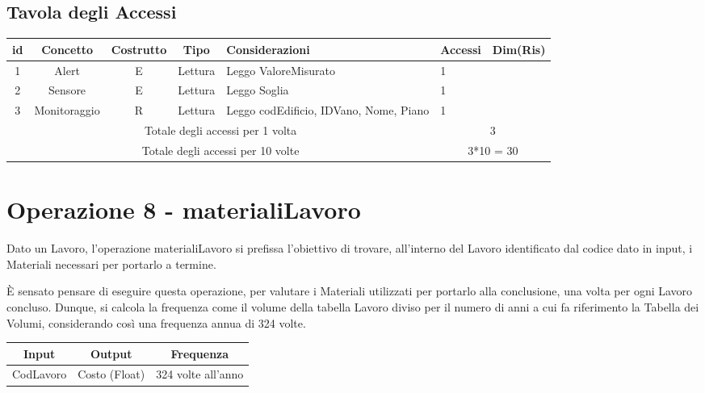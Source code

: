 \documentclass[12pt,a4paper]{report}
\begin{document}
        \subsection{Tavola degli Accessi}
        \begin{tabular}{|c|c|c|c|p{4cm}|p{3cm}|p{3cm}|}
            \hline
            \textbf{id} & \textbf{Concetto} & \textbf{Costrutto} & \textbf{Tipo} & \textbf{Considerazioni} & \textbf{Accessi} & \textbf{Dim(Ris)} \\ \hline
            1 & Alert & E & Lettura & Leggo ValoreMisurato & 1 & ~ \\ \hline
            2 & Sensore & E & Lettura & Leggo Soglia & 1 & ~ \\ \hline
            3 & Monitoraggio & R & Lettura & Leggo codEdificio, IDVano, Nome, Piano & 1 & ~ \\ \hline
            \multicolumn{5}{|c|}{Totale degli accessi per 1 volta} & \multicolumn{2}{|c|}{3} \\ \hline
            \multicolumn{5}{|c|}{Totale degli accessi per 10 volte} & \multicolumn{2}{|c|}{3*10 = 30} \\ \hline
        \end{tabular}

        \section{Operazione 8 - materialiLavoro}
        Dato un Lavoro, l'operazione materialiLavoro si prefissa l'obiettivo di trovare, all'interno del Lavoro identificato dal codice dato in input, i Materiali necessari per portarlo a termine.

        È sensato pensare di eseguire questa operazione, per valutare i Materiali utilizzati per portarlo alla conclusione, una volta per ogni Lavoro concluso. Dunque, si calcola la frequenza come il volume della tabella Lavoro diviso per il numero di anni a cui fa riferimento la Tabella dei Volumi, considerando così una frequenza annua di 324 volte. 
        \begin{center}
            \begin{tabular}{|c|c|c|}
                \hline
                \rowcolor{viola} \textbf{Input} & \textbf{Output} & \textbf{Frequenza} \\ \hline
                CodLavoro & Costo (Float) & 324 volte all'anno \\ \hline
            \end{tabular}
        \end{center}
\end{document}
